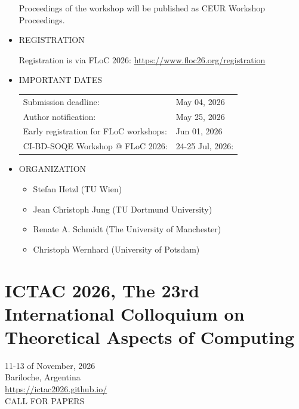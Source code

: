 \documentclass[prodmode,acmtecs]{acmsmall} %
\begin{document}
\begin{itemize}
  Proceedings of the workshop will be published as CEUR Workshop Proceedings. 
 
\item  REGISTRATION 
 
  Registration is via FLoC 2026: \href{https://www.floc26.org/registration}{https://www.floc26.org/registration} 
 
\item  IMPORTANT DATES 
 
\begin{tabulary}{\linewidth}{LL}Submission deadline:  & May 04, 2026 \\
Author notification:  & May 25, 2026 \\
Early registration for FLoC workshops:  & Jun 01, 2026 \\
CI-BD-SOQE Workshop @ FLoC 2026:  & 24-25 Jul, 2026: \\
\end{tabulary}
 
\item  ORGANIZATION 
 
\begin{itemize}\item  Stefan Hetzl (TU Wien)
\item  Jean Christoph Jung (TU Dortmund University)
\item   Renate A. Schmidt (The University of Manchester)
\item   Christoph Wernhard (University of Potsdam)
\end{itemize} 
\end{itemize}\section{ICTAC 2026, The 23rd International Colloquium on Theoretical Aspects of Computing}\label{ICTAC2026The23rdInternationalColloquiumonTheoreticalAspectsofComputing}  11-13 of November, 2026\\ 
  Bariloche, Argentina\\ 
  \href{https://ictac2026.github.io/}{https://ictac2026.github.io/}\\ 
CALL FOR PAPERS 
\end{document}
